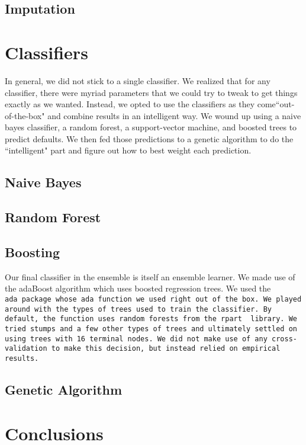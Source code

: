 \documentclass[11pt, oneside]{article}   	%
\begin{document}
	\subsection{Imputation}
\section{Classifiers}
In general, we did not stick to a single classifier. We realized that for any classifier, there were myriad
parameters that we could try to tweak to get things exactly as we wanted. Instead, we 
opted to use the classifiers as they come``out-of-the-box" and combine results in an intelligent way. 
We wound up using a naive bayes classifier, a random forest, a support-vector machine, and 
boosted trees to predict defaults. We then fed those predictions to a genetic algorithm to do
the ``intelligent" part and figure out how to best weight each prediction.
	\subsection{Naive Bayes}
	\subsection{Random Forest}
	\subsection{Boosting}
	Our final classifier in the ensemble is itself an ensemble learner. We made use of the
	adaBoost algorithm which uses boosted regression trees. We used the \tt ada\rm~package
	whose \tt ada\rm~function we used right out of the box. We played around with the types of
	trees used to train the classifier. By default, the function uses random forests from the \tt rpart
	\rm~library. We tried stumps and a few other types of trees and ultimately settled
	on using trees with 16 terminal nodes. We did not make use of any cross-validation
	to make this decision, but instead relied on empirical results.
	\subsection{Genetic Algorithm}
\section{Conclusions}
\end{document}
